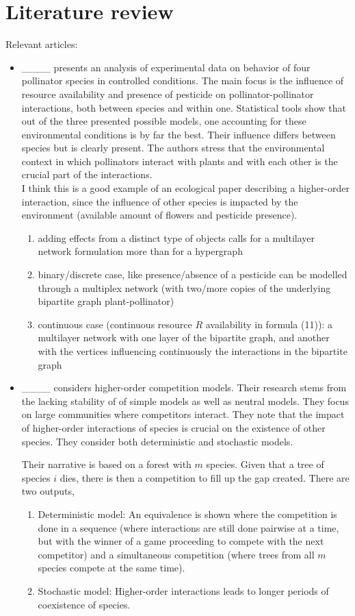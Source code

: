\section{Literature review}
Relevant articles:
\begin{itemize}

\item ____ presents an analysis of experimental data on behavior of four pollinator species in controlled conditions. The main focus is the influence of resource availability and presence of pesticide on pollinator-pollinator interactions, both between species and within one. Statistical tools show that out of the three presented possible models, one accounting for these environmental conditions is by far the best. Their influence differs between species but is clearly present. The authors stress that the environmental context in which pollinators interact with plants and with each other is the crucial part of the interactions. \\
I think this is a good example of an ecological paper describing a higher-order interaction, since the influence of other species is impacted by the environment (available amount of flowers and pesticide presence).
\begin{enumerate}
    \item adding effects from a distinct type of objects calls for a multilayer network formulation more than for a hypergraph 
    \item binary/discrete case, like presence/absence of a pesticide can be modelled through a multiplex network (with two/more copies of the underlying bipartite graph plant-pollinator)
    \item continuous case (continuous resource $R$ availability in formula (11)): a multilayer network with one layer of the bipartite graph, and another with the vertices influencing continuously the interactions in the bipartite graph
\end{enumerate}

\item ____ considers higher-order competition models. Their research stems from the lacking stability of of simple models as well as neutral models. They focus on large communities where competitors interact. They note that the impact of higher-order interactions of species is crucial on the existence of other species. They consider both deterministic and stochastic models.

Their narrative is based on a forest with $ m $ species. Given that a tree of species $ i $ dies, there is then a competition to fill up the gap created. There are two outputs,
\begin{enumerate}
    \item Deterministic model: An equivalence is shown where the competition is done in a sequence (where interactions are still done pairwise at a time, but with the winner of a game proceeding to compete with the next competitor) and a simultaneous competition (where trees from all $ m $ species compete at the same time).
    \item Stochastic model: Higher-order interactions leads to longer periods of coexistence of species.
\end{enumerate}


\end{itemize}

